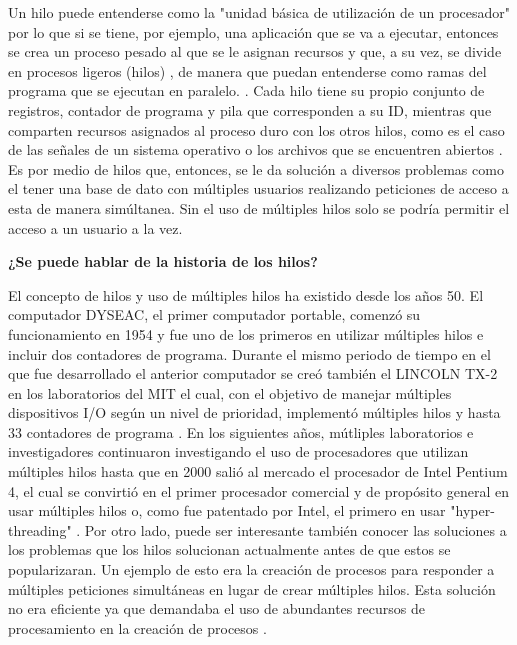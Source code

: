 \documentclass[a4paper,11pt]{article}
\begin{document}
Un hilo puede entenderse como la "unidad básica de utilización de un procesador" \cite[p.43]{rodriguez2007gran} por lo que si se tiene, por ejemplo, una aplicación que se va a ejecutar,  entonces se crea un proceso pesado al que se le asignan recursos y que, a su vez, se divide en procesos ligeros (hilos) \cite[p.68]{candela2007fundamentos}, de manera que puedan entenderse como ramas del programa que se ejecutan en paralelo. \cite[p.70]{pascual2002conceptos}.
Cada hilo tiene su propio conjunto de registros, contador de programa y pila \cite{rodriguez2007gran}\cite{candela2007fundamentos} que corresponden a su ID, mientras que comparten recursos asignados al proceso duro con los otros hilos, como es el caso de las señales de un sistema operativo o los archivos que se encuentren abiertos \cite{rodriguez2007gran}.
Es por medio de hilos que, entonces, se le da solución a diversos problemas como el tener una base de dato con múltiples usuarios realizando peticiones de acceso a esta de manera simúltanea. Sin el uso de múltiples hilos solo se podría permitir el acceso a un usuario a la vez.

{\large\bfseries ¿Se puede hablar de la historia de los hilos?} 

El concepto de hilos y uso de múltiples hilos ha existido desde los años 50. El computador DYSEAC, el primer computador portable, comenzó su funcionamiento en 1954 y fue uno de los primeros en utilizar múltiples hilos e incluir dos contadores de programa. Durante el mismo periodo de tiempo en el que fue desarrollado el anterior computador se creó también el LINCOLN TX-2 en los laboratorios del MIT el cual, con el objetivo de manejar múltiples dispositivos I/O según un nivel de prioridad, implementó múltiples hilos y hasta 33 contadores de programa \cite[p.83]{nemirovsky2013multithreading}.
En los siguientes años, mútliples laboratorios e investigadores continuaron investigando el uso de procesadores que utilizan múltiples hilos hasta que en 2000 salió al mercado el procesador de Intel Pentium 4, el cual se convirtió en el primer procesador comercial y de propósito general en usar múltiples hilos o, como fue patentado por Intel, el primero en usar "hyper-threading"
\cite[p.91]{nemirovsky2013multithreading}.
Por otro lado, puede ser interesante también conocer las soluciones a los problemas que los hilos solucionan actualmente antes de que estos se popularizaran. Un ejemplo de esto era la creación de procesos para responder a múltiples peticiones simultáneas en lugar de crear múltiples hilos. Esta solución no era eficiente ya que demandaba el uso de abundantes recursos de procesamiento en la creación de procesos \cite[p.43]{rodriguez2007gran}.
\end{document}
